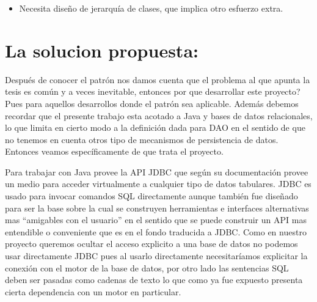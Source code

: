 \begin{itemize}
\item Necesita diseño de jerarquía de clases, que implica otro esfuerzo extra. %

\end{itemize}


\section{La solucion propuesta: \jj}
Después de conocer el patrón nos damos cuenta que el problema al que apunta la tesis es común y a veces inevitable, entonces por que desarrollar este proyecto? Pues para aquellos desarrollos donde el patrón sea aplicable. Además debemos recordar que el presente trabajo esta acotado a Java y bases de datos relacionales, lo que limita en cierto modo a la definición dada para DAO en el sentido de que no tenemos en cuenta otros tipo de mecanismos de persistencia de datos. Entonces veamos específicamente de que trata el proyecto.

Para trabajar con \dd Java provee la API JDBC\cite{java:jdbc} que según su documentación provee un medio para acceder virtualmente a cualquier tipo de datos tabulares. JDBC es usado para invocar comandos SQL directamente aunque también fue diseñado para ser la base sobre la cual se construyen herramientas e interfaces alternativas mas ``amigables con el usuario'' en el sentido que se puede construir un API mas entendible o conveniente que es en el fondo traducida a JDBC. Como en nuestro proyecto queremos ocultar el acceso explicito a una base de datos no podemos usar directamente JDBC pues al usarlo directamente necesitaríamos explicitar la conexión con el motor de la base de datos, por otro lado las sentencias SQL deben ser pasadas como cadenas de texto lo que como ya fue expuesto presenta cierta dependencia con un motor en particular.

